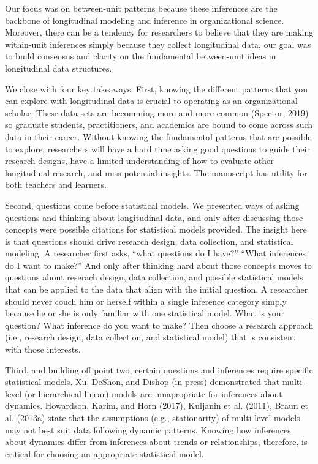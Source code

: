 \documentclass[english,,man]{apa6}
\theoremstyle{definition}
\theoremstyle{definition}
\theoremstyle{definition}
\theoremstyle{remark}
\begin{document}
Our focus was on between-unit patterns because these inferences are the
backbone of longitudinal modeling and inference in organizational
science. Moreover, there can be a tendency for researchers to believe
that they are making within-unit inferences simply because they collect
longitudinal data, our goal was to build consensus and clarity on the
fundamental between-unit ideas in longitudinal data structures.

We close with four key takeaways. First, knowing the different patterns
that you can explore with longitudinal data is crucial to operating as
an organizational scholar. These data sets are becomming more and more
common (Spector, 2019) so graduate students, practitioners, and
academics are bound to come across such data in their career. Without
knowing the fundamental patterns that are possible to explore,
researchers will have a hard time asking good questions to guide their
research designs, have a limited understanding of how to evaluate other
longitudinal research, and miss potential insights. The manuscript has
utility for both teachers and learners.

Second, questions come before statistical models. We presented ways of
asking questions and thinking about longitudinal data, and only after
discussing those concepts were possible citations for statistical models
provided. The insight here is that questions should drive research
design, data collection, and statistical modeling. A researcher first
asks, \enquote{what questions do I have?} \enquote{What inferences do I
want to make?} And only after thinking hard about those concepts moves
to questions about reserach design, data collection, and possible
statistical models that can be applied to the data that align with the
initial question. A researcher should never couch him or herself within
a single inference category simply because he or she is only familiar
with one statistical model. What is your question? What inference do you
want to make? Then choose a research approach (i.e., research design,
data collection, and statistical model) that is consistent with those
interests.

Third, and building off point two, certain questions and inferences
require specific statistical models. Xu, DeShon, and Dishop (in press)
demonstrated that multi-level (or hierarchical linear) models are
innapropriate for inferences about dynamics. Howardson, Karim, and Horn
(2017), Kuljanin et al. (2011), Braun et al. (2013a) state that the
assumptions (e.g., stationarity) of multi-level models may not best suit
data following dynamic patterns. Knowing how inferences about dynamics
differ from inferences about trends or relationships, therefore, is
critical for choosing an appropriate statistical model.
\end{document}

